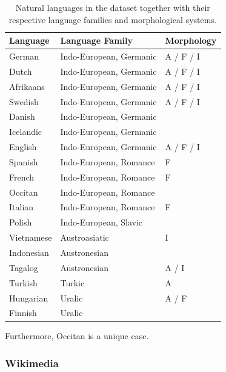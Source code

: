 \documentclass[12pt,a4paper]{article}
\numberwithin{figure}{section}
\numberwithin{table}{section}
\numberwithin{definition}{section}
\begin{document}
\begin{table}[!h]
  \centering
  \renewcommand{\arraystretch}{1.5}
  \begin{tabular} {|p{2cm}|p{5cm}|p{3cm}|}
  \hline
  \textbf{Language} & \textbf{Language Family} & \textbf{Morphology} \\
  \hline
  German & Indo-European, Germanic & A / F / I  \\
  Dutch & Indo-European, Germanic & A / F / I \\
  Afrikaans & Indo-European, Germanic & A / F / I \\
  Swedish & Indo-European, Germanic & A / F / I \\
  Danish & Indo-European, Germanic & \\
  Icelandic & Indo-European, Germanic & \\
  English & Indo-European, Germanic & A / F / I \\
  Spanish & Indo-European, Romance & F \\
  French & Indo-European, Romance & F \\
  Occitan & Indo-European, Romance & \\
  Italian & Indo-European, Romance & F \\
  Polish & Indo-European, Slavic & \\
  Vietnamese & Austroasiatic & I \\
  Indonesian & Austronesian & \\
  Tagalog & Austronesian & A / I \\
  Turkish & Turkic & A \\
  Hungarian & Uralic & A / F \\
  Finnish & Uralic & \\
  \hline
  \end{tabular}
  \caption{Natural languages in the dataset together with their respective language families and morphological systems.}
  \label{tbl:natlangs}
\end{table}

Furthermore, Occitan is a unique case.


\subsubsection{Wikimedia}
\label{ssec:wikimedia}

\end{document}
